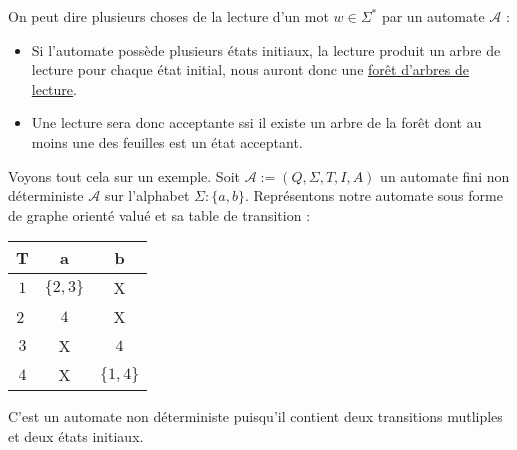 \begin{proposition}
    On peut dire plusieurs choses de la lecture d'un mot $w \in \Sigma^*$ par un automate $ \mathcal{A}$ :
    \begin{itemize}
        \item Si l'automate possède plusieurs états initiaux, la lecture produit un arbre de lecture pour chaque 
        état initial, nous auront donc une \underline{forêt d'arbres de lecture}. 
        \item Une lecture sera donc acceptante ssi il existe un arbre de la forêt dont au moins une des feuilles
        est un état acceptant. 
    \end{itemize}
\end{proposition}

\begin{example}
    Voyons tout cela sur un exemple. Soit $ \mathcal{A} := (Q,\Sigma, T,I,A)$ un automate fini non déterministe $ \mathcal{A}$
    sur l'alphabet $\Sigma : \{a,b\}$. Représentons notre automate sous forme de graphe orienté valué et sa table de transition :
    \begin{center}
        \begin{minipage}{0.45\textwidth} %
        \end{minipage}%
        \hfill 
        \begin{minipage}{0.45\textwidth} %
            \begin{tabular}{c|c|c}
                T & a & b \\ \hline 
                $1$ & $\{2,3\}$ & X \\ \hline 
                \textcircled{2} & $4$ & X \\ \hline 
                $3$ & X & $4$ \\ \hline 
                $4$ & X & $\{1,4\}$ 
            \end{tabular}
        \end{minipage}
    \end{center}
    C'est un automate non déterministe puisqu'il contient deux transitions mutliples et deux états initiaux. 


\end{example}

